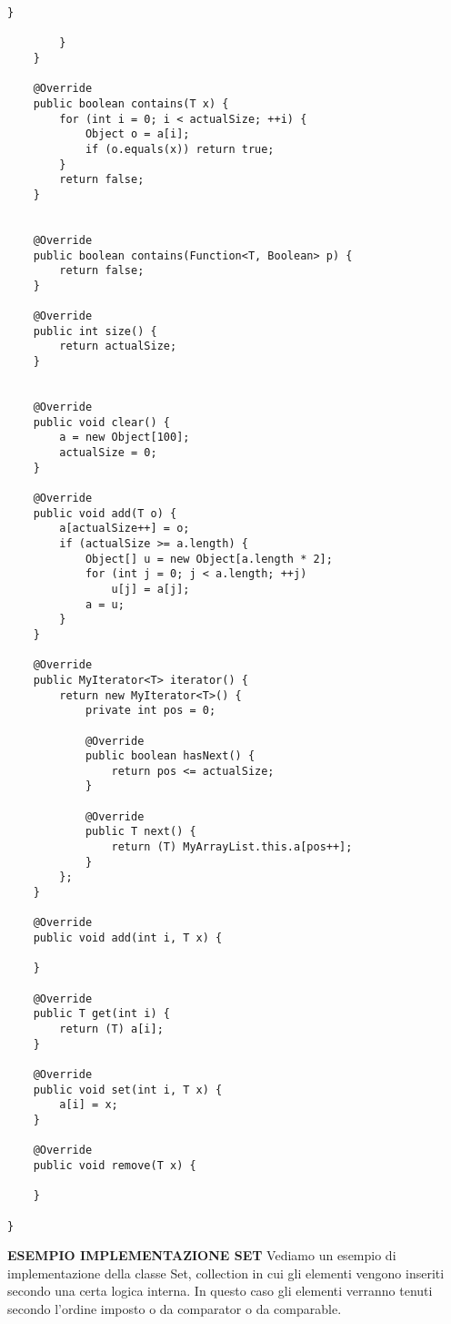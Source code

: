 \begin{lstlisting}[basicstyle=\small,]
            }

        }
    }

    @Override
    public boolean contains(T x) {
        for (int i = 0; i < actualSize; ++i) {
            Object o = a[i];
            if (o.equals(x)) return true;
        }
        return false;
    }


    @Override
    public boolean contains(Function<T, Boolean> p) {
        return false;
    }

    @Override
    public int size() {
        return actualSize;
    }


    @Override
    public void clear() {
        a = new Object[100];
        actualSize = 0;
    }

    @Override
    public void add(T o) {
        a[actualSize++] = o;
        if (actualSize >= a.length) {
            Object[] u = new Object[a.length * 2];
            for (int j = 0; j < a.length; ++j)
                u[j] = a[j];
            a = u;
        }
    }

    @Override
    public MyIterator<T> iterator() {
        return new MyIterator<T>() {
            private int pos = 0;

            @Override
            public boolean hasNext() {
                return pos <= actualSize;
            }

            @Override
            public T next() {
                return (T) MyArrayList.this.a[pos++];
            }
        };
    }

    @Override
    public void add(int i, T x) {

    }

    @Override
    public T get(int i) {
        return (T) a[i];
    }

    @Override
    public void set(int i, T x) {
        a[i] = x;
    }

    @Override
    public void remove(T x) {

    }

}
\end{lstlisting}

\noindent \textbf{ESEMPIO IMPLEMENTAZIONE SET}\newline
Vediamo un esempio di implementazione della classe Set, collection in cui gli elementi vengono inseriti secondo una certa logica interna. In questo caso gli elementi verranno tenuti secondo l'ordine imposto o da comparator o da comparable.

